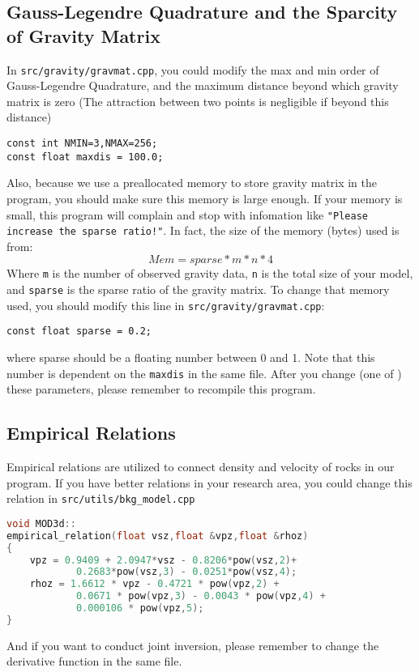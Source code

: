 \documentclass[UTF8]{article}
\begin{document}
\subsection{Gauss-Legendre Quadrature and 
the Sparcity of Gravity Matrix}
In \verb!src/gravity/gravmat.cpp!, you could modify the 
max and min order of Gauss-Legendre Quadrature,
and the maximum distance beyond which gravity matrix is zero (The attraction between two 
points is negligible if beyond this distance)
\begin{lstlisting}
const int NMIN=3,NMAX=256;
const float maxdis = 100.0;
\end{lstlisting}
Also, because we use a preallocated memory to store gravity matrix 
in the program, you should make sure this memory is large enough. If 
your memory is small, this program will complain and stop with
infomation like \texttt{"Please increase the sparse ratio!"}. In fact,
the size of the memory (bytes) used is from:
\[
    Mem = sparse * m * n * 4 
\]
Where \texttt{m} is the number of observed gravity data, 
\texttt{n} is the total size of your 
model, and \texttt{sparse} is the sparse ratio of the gravity matrix.
To change that memory used, you should modify this line in 
\texttt{src/gravity/gravmat.cpp}:
\begin{lstlisting}
const float sparse = 0.2;
\end{lstlisting}
where sparse should be a floating number between 0 and 1. Note that 
this number is dependent on the \texttt{maxdis} in the same file.
After you change (one of ) these parameters, please remember
to recompile this program. 

\subsection{Empirical Relations}
Empirical relations are utilized to connect density and 
velocity of rocks in our program. If you have better relations 
in your research area, you could change this relation 
in \verb!src/utils/bkg_model.cpp! 
\begin{lstlisting}[language=c++]
void MOD3d:: 
empirical_relation(float vsz,float &vpz,float &rhoz)
{
    vpz = 0.9409 + 2.0947*vsz - 0.8206*pow(vsz,2)+ 
            0.2683*pow(vsz,3) - 0.0251*pow(vsz,4);
    rhoz = 1.6612 * vpz - 0.4721 * pow(vpz,2) + 
            0.0671 * pow(vpz,3) - 0.0043 * pow(vpz,4) + 
            0.000106 * pow(vpz,5);
}
\end{lstlisting}
And if you want to conduct joint inversion, please remember to
change the derivative function in the same file.
\end{document}
